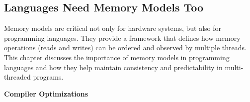 \subsection{Languages Need Memory Models Too}

Memory models are critical not only for hardware systems, but also for programming languages. They provide a framework that defines how memory operations (reads and writes) can be ordered and observed by multiple threads. This chapter discusses the importance of memory models in programming languages and how they help maintain consistency and predictability in multi-threaded programs.

\highspace
\begin{flushleft}
    \textcolor{Green3}{ \textbf{Compiler Optimizations}}
\end{flushleft}
